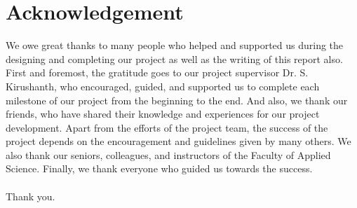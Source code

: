 \documentclass{article}
\begin{document}
\section*{Acknowledgement}

We owe great thanks to many people who helped and supported us during the designing and completing our project as well as the writing of this report also. First and foremost, the gratitude goes to our project supervisor Dr. S. Kirushanth, who encouraged, guided, and supported us to complete each milestone of our project from the beginning to the end. And also, we thank our friends, who have shared their knowledge and experiences for our project development. Apart from the efforts of the project team, the success of the project depends on the encouragement and guidelines given by many others. We also thank our seniors, colleagues, and instructors of the Faculty of Applied Science. Finally, we thank everyone who guided us towards the success. \\\\ Thank you.
\end{document}
